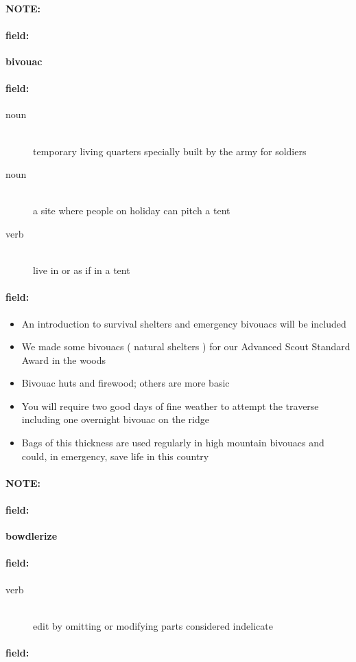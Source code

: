 \documentclass[12pt]{article}
\newenvironment{note}{\paragraph{NOTE:}}{}
\newenvironment{field}{\paragraph{field:}}{}
\begin{document}
\begin{note}
\begin{field}
\textbf{\large bivouac}
\end{field}


\begin{field}
\begin{description}
\item[noun] \hfill \\ 
temporary living quarters specially built by the army for soldiers

\item[noun] \hfill \\ 
a site where people on holiday can pitch a tent

\item[verb] \hfill \\ 
live in or as if in a tent

\end{description}
\end{field}

\begin{field}
\begin{itemize}
\item An introduction to survival shelters and emergency bivouacs will be included
\item We made some bivouacs ( natural shelters ) for our Advanced Scout Standard Award in the woods
\item Bivouac huts and firewood; others are more basic
\item You will require two good days of fine weather to attempt the traverse including one overnight bivouac on the ridge
\item Bags of this thickness are used regularly in high mountain bivouacs and could, in emergency, save life in this country
\end{itemize}
\end{field}
\end{note}
\begin{note}
\begin{field}
\textbf{\large bowdlerize}
\end{field}


\begin{field}
\begin{description}
\item[verb] \hfill \\ 
edit by omitting or modifying parts considered indelicate

\end{description}
\end{field}

\begin{field}
\end{field}
\end{note}
\end{document}
